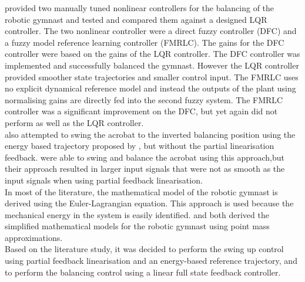 \citet{Brown1997} provided two manually tuned nonlinear controllers for the balancing of the robotic gymnast and tested and compared them against a designed LQR controller. The two nonlinear controller were a direct fuzzy controller (DFC) and a fuzzy model reference learning controller (FMRLC). The gains for the DFC controller were based on the gains of the LQR controller. The DFC controller was implemented and successfully balanced the gymnast. However the LQR controller provided smoother state trajectories and smaller control input. The FMRLC uses no explicit dynamical reference model and instead the outputs of the plant using normalising gains are directly fed into the second fuzzy system. The FMRLC controller was a significant improvement on the DFC, but yet again did not perform as well as the LQR controller.\\


\citeauthor{Brown1997} also attempted to swing the acrobat to the inverted balancing position using the energy based trajectory proposed by \citeauthor{spong_swingup}, but without the partial linearisation feedback. \citeauthor{Brown1997} were able to swing and balance the acrobat using this approach,but their approach resulted in larger input signals that were not as smooth as the input signals when using partial feedback linearisation.\\



In most of the literature, the mathematical model of the robotic gymnast is derived using the Euler-Lagrangian equation. This approach is used because the mechanical energy in the system is easily identified. \citet{derivation_controlPlaner} and \citet{tedrake} both derived the simplified mathematical models for the robotic gymnast using point mass approximations. \\

Based on the literature study, it was decided to perform the swing up control using partial feedback linearisation and an energy-based reference trajectory, and to perform the balancing control using a linear full state feedback controller.


